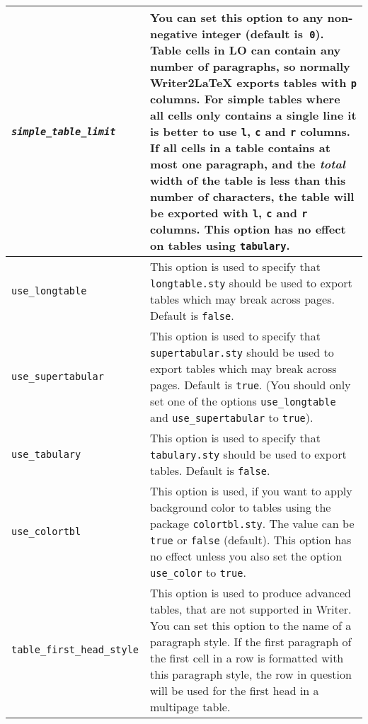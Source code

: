 \documentclass{article}
\newcommand\textstyleSourceText[1]{\texttt{\textmd{#1}}}
\begin{document}
\begin{center}
\begin{tabular}{|l|l|}

\hline
\mdseries \textstyleSourceText{\emph{simple\_table\_limit}} & \mdseries You can set this option to any non-negative integer (default is~\textstyleSourceText{0}). Table cells in LO can contain any number of paragraphs, so normally Writer2LaTeX exports tables with \textstyleSourceText{p} columns. For simple tables where all cells only contains a single line it is better to use \textstyleSourceText{l}, \textstyleSourceText{c} and \textstyleSourceText{r} columns. If all cells in a table contains at most one paragraph, and the \emph{total} width of the table is less than this number of characters, the table will be exported with \textstyleSourceText{l}, \textstyleSourceText{c} and \textstyleSourceText{r} columns. This option has no effect on tables using \textstyleSourceText{tabulary}.\\\hline
\mdseries \textstyleSourceText{use\_longtable} & \mdseries This option is used to specify that \textstyleSourceText{longtable.sty} should be used to export tables which may break across pages. Default is \textstyleSourceText{false}.\\\hline
\mdseries \textstyleSourceText{use\_supertabular} & \mdseries This option is used to specify that \textstyleSourceText{supertabular.sty} should be used to export tables which may break across pages. Default is \textstyleSourceText{true}. (You should only set one of the options \textstyleSourceText{use\_longtable} and \textstyleSourceText{use\_supertabular} to \textstyleSourceText{true}).\\\hline
\mdseries \textstyleSourceText{use\_tabulary} & \mdseries This option is used to specify that \textstyleSourceText{tabulary.sty} should be used to export tables. Default is \textstyleSourceText{false}.\\\hline
\mdseries \textstyleSourceText{use\_colortbl} & \mdseries This option is used, if you want to apply background color to tables using the package \textstyleSourceText{colortbl.sty}. The value can be \textstyleSourceText{true} or \textstyleSourceText{false} (default). This option has no effect unless you also set the option \textstyleSourceText{use\_color} to \textstyleSourceText{true}.\\\hline
\mdseries \textstyleSourceText{table\_first\_head\_style} & \mdseries This option is used to produce advanced tables, that are not supported in Writer. You can set this option to the name of a paragraph style. If the first paragraph of the first cell in a row is formatted with this paragraph style, the row in question will be used for the first head in a multipage table.\\\hline

\end{tabular}
\end{center}
\end{document}
